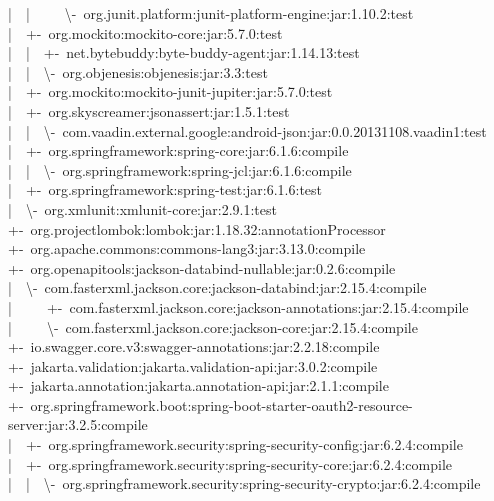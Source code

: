 |~~|~~~~~\textbackslash-~org.junit.platform:junit-platform-engine:jar:1.10.2:test\\
|~~+-~org.mockito:mockito-core:jar:5.7.0:test\\
|~~|~~+-~net.bytebuddy:byte-buddy-agent:jar:1.14.13:test\\
|~~|~~\textbackslash-~org.objenesis:objenesis:jar:3.3:test\\
|~~+-~org.mockito:mockito-junit-jupiter:jar:5.7.0:test\\
|~~+-~org.skyscreamer:jsonassert:jar:1.5.1:test\\
|~~|~~\textbackslash-~com.vaadin.external.google:android-json:jar:0.0.20131108.vaadin1:test\\
|~~+-~org.springframework:spring-core:jar:6.1.6:compile\\
|~~|~~\textbackslash-~org.springframework:spring-jcl:jar:6.1.6:compile\\
|~~+-~org.springframework:spring-test:jar:6.1.6:test\\
|~~\textbackslash-~org.xmlunit:xmlunit-core:jar:2.9.1:test\\
+-~org.projectlombok:lombok:jar:1.18.32:annotationProcessor\\
+-~org.apache.commons:commons-lang3:jar:3.13.0:compile\\
+-~org.openapitools:jackson-databind-nullable:jar:0.2.6:compile\\
|~~\textbackslash-~com.fasterxml.jackson.core:jackson-databind:jar:2.15.4:compile\\
|~~~~~+-~com.fasterxml.jackson.core:jackson-annotations:jar:2.15.4:compile\\
|~~~~~\textbackslash-~com.fasterxml.jackson.core:jackson-core:jar:2.15.4:compile\\
+-~io.swagger.core.v3:swagger-annotations:jar:2.2.18:compile\\
+-~jakarta.validation:jakarta.validation-api:jar:3.0.2:compile\\
+-~jakarta.annotation:jakarta.annotation-api:jar:2.1.1:compile\\
+-~org.springframework.boot:spring-boot-starter-oauth2-resource-server:jar:3.2.5:compile\\
|~~+-~org.springframework.security:spring-security-config:jar:6.2.4:compile\\
|~~+-~org.springframework.security:spring-security-core:jar:6.2.4:compile\\
|~~|~~\textbackslash-~org.springframework.security:spring-security-crypto:jar:6.2.4:compile\\
